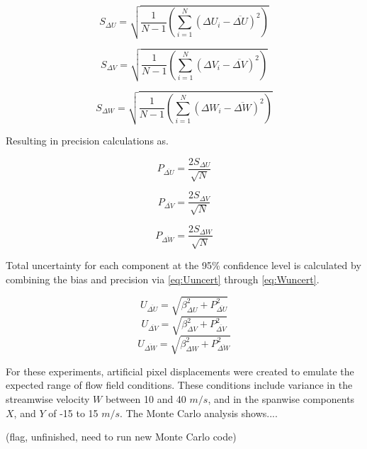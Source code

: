 \begin{equation}
S_{\Delta U} = \sqrt{\frac{1}{N-1} \left(\sum_{i=1}^N (\Delta U_i - 
\overline{\Delta U})^2 \right)}
\label{eq:Usd}
\end{equation}

\begin{equation}
S_{\Delta V} = \sqrt{\frac{1}{N-1} \left(\sum_{i=1}^N (\Delta V_i - 
	\overline{\Delta V})^2 \right)}
\label{eq:Vsd}
\end{equation}

\begin{equation}
S_{\Delta W} = \sqrt{\frac{1}{N-1} \left(\sum_{i=1}^N (\Delta W_i - 
	\overline{\Delta W})^2 \right)}
\label{eq:Wsd}
\end{equation}

Resulting in precision calculations as.
	
\begin{equation}
P_{\overline{\Delta U}} = \frac{2 S_{\Delta U}}{\sqrt{N}}
\label{eq:Uprec}
\end{equation}

\begin{equation}
P_{\overline{\Delta V}} = \frac{2 S_{\Delta V}}{\sqrt{N}}
\label{eq:Vsd}
\end{equation}

\begin{equation}
P_{\overline{\Delta W}} = \frac{2 S_{\Delta W}}{\sqrt{N}}
\label{eq:Wsd}
\end{equation}

Total uncertainty for each component at the 95\% confidence level is calculated 
by combining the bias and precision via \ref{eq:Uuncert} through 
\ref{eq:Wuncert}.

\begin{equation}
U_{\overline{\Delta U}} = \sqrt{\beta_{\Delta U}^2 + P_{\overline{\Delta U}}^2}
\label{eq:Uuncert}
\end{equation}
\begin{equation}
U_{\overline{\Delta V}} = \sqrt{\beta_{\Delta V}^2 + P_{\overline{\Delta V}}^2}
\label{eq:Vuncert}
\end{equation}
\begin{equation}
U_{\overline{\Delta W}} = \sqrt{\beta_{\Delta W}^2 + P_{\overline{\Delta W}}^2}
\label{eq:Wuncert}
\end{equation}


For these experiments, artificial pixel displacements were created to emulate 
the expected range of flow field conditions. These conditions include variance 
in the streamwise velocity $W$ between 10 and 40 $m/s$, and in the spanwise 
components $X$, and $Y$ of -15 to 15 $m/s$. The Monte Carlo analysis shows....

(flag, unfinished, need to run new Monte Carlo code)